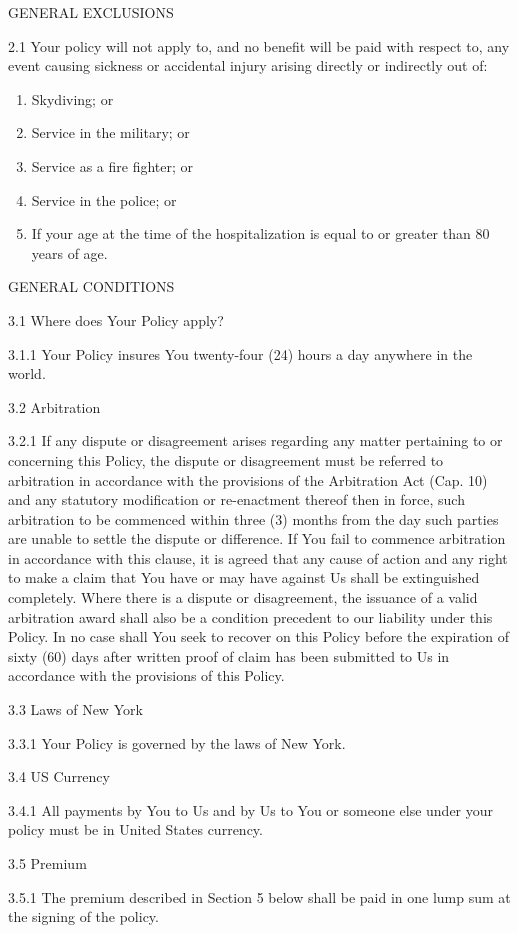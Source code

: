 GENERAL EXCLUSIONS

2.1 Your policy will not apply to, and no benefit will be paid with respect to, any event causing sickness or accidental injury arising directly or indirectly out of:
\begin{enumerate}
    \item Skydiving; or
    \item Service in the military; or
    \item Service as a fire fighter; or
    \item Service in the police; or
    \item If your age at the time of the hospitalization is equal to or greater than 80 years of age.
\end{enumerate}

GENERAL CONDITIONS

3.1 Where does Your Policy apply?

3.1.1 Your Policy insures You twenty-four (24) hours a day anywhere in the world.

3.2 Arbitration

3.2.1 If any dispute or disagreement arises regarding any matter pertaining to or concerning this Policy, the dispute or disagreement must be referred to arbitration in accordance with the provisions of the Arbitration Act (Cap. 10) and any statutory modification or re-enactment thereof then in force, such arbitration to be commenced within three (3) months from the day such parties are unable to settle the dispute or difference. If You fail to commence arbitration in accordance with this clause, it is agreed that any cause of action and any right to make a claim that You have or may have against Us shall be extinguished completely. Where there is a dispute or disagreement, the issuance of a valid arbitration award shall also be a condition precedent to our liability under this Policy. In no case shall You seek to recover on this Policy before the expiration of sixty (60) days after written proof of claim has been submitted to Us in accordance with the provisions of this Policy.

3.3 Laws of New York

3.3.1 Your Policy is governed by the laws of New York.

3.4 US Currency

3.4.1 All payments by You to Us and by Us to You or someone else under your policy must be in United States currency.

3.5 Premium

3.5.1 The premium described in Section 5 below shall be paid in one lump sum at the signing of the policy.

